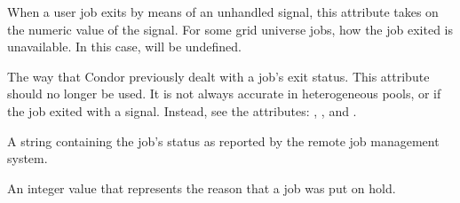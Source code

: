 \begin{description}
\item[\AdAttr{ExitSignal}:]  When a user job exits by means of an unhandled 
signal, this attribute takes on the numeric value of the signal.
For some grid universe jobs, how the job exited is
unavailable. In this case,  will be undefined.


\item[\AdAttr{ExitStatus}:]  The way that Condor previously dealt with
a job's exit status.
This attribute should no longer be used.
It is not always accurate in
heterogeneous pools, or if the job exited with a signal.
Instead, see the attributes: ,
, and
.

\item[\AdAttr{GridJobStatus}:] A string containing the job's status as
reported by the remote job management system.

\item[\AdAttr{HoldReasonCode}:]    An integer value that represents the
reason that a job was put on hold.


\end{description}
